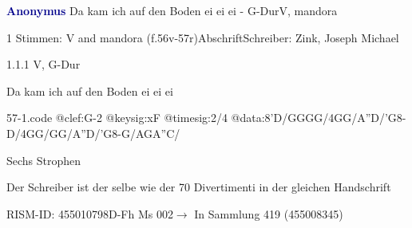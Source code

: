 \documentclass[twocolumn, 12pt]{book}
\begin{document}
\par \vspace{16pt} \textcolor{darkblue}{\textbf{Anonymus  }}\hfillplus{\textbf{[57]}}\newline Da kam ich auf den Boden ei ei ei - G-Dur\newline V, mandora
\par \begin{itshape}\end{itshape} 
\par \textcolor{darkblue}{}  1 Stimmen: V and mandora  (f.56v-57r)\newline Abschrift\newline Schreiber: Zink, Joseph Michael
\par 1.1.1  V, G-Dur\newline \begin{footnotesize} Da kam ich auf den Boden ei ei ei \end{footnotesize}  
\begin{filecontents*}{57-1.code}
@clef:G-2
@keysig:xF
@timesig:2/4
@data:8'D/GGGG/4GG/A''D/'G8-D/4GG/GG/A''D/'G8-G/AGA''C/
\end{filecontents*}
\newline %
\par Sechs Strophen
\par Der Schreiber ist der selbe wie der 70 Divertimenti in der gleichen Handschrift
\par RISM-ID: 455010798\newline D-Fh  Ms 002\newline $\rightarrow$ In Sammlung 419 (455008345)
      
\end{document}
